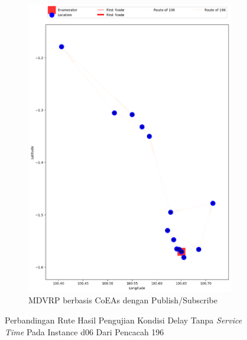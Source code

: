 \begin{figure}[H]\ContinuedFloat
	\centering
	\begin{subfigure}[t]{\textwidth}
		\centering
		\includegraphics[width=\textwidth]{Resources/Images/delayed_6/real_m15_n100_delayed_6_196_pubsub_coes}
		\caption{MDVRP berbasis CoEAs dengan Publish/Subscribe}
		\label{fig:real_m15_n100_delayed_6_196_pubsub_coes}
	\end{subfigure}
	\caption{Perbandingan Rute Hasil Pengujian Kondisi Delay Tanpa \textit{Service Time} Pada Instance d06 Dari Pencacah 196}
	\label{fig:real_m15_n100_delayed_6_196_contd}
\end{figure}


